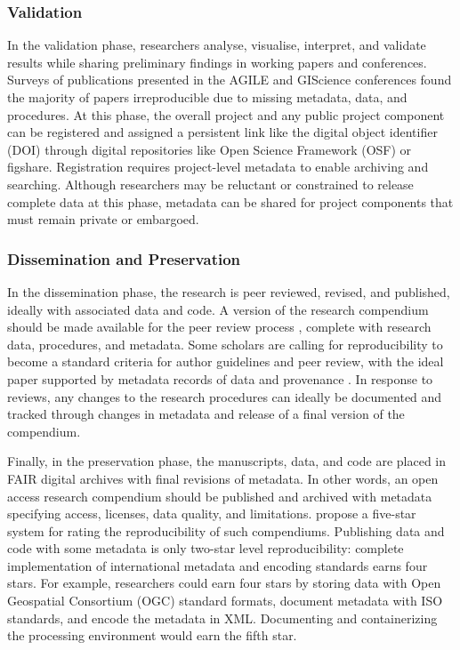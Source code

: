 \documentclass{isprs} %
\begin{document}
\subsubsection{Validation}

In the validation phase, researchers analyse, visualise, interpret, and validate results while sharing preliminary findings in working papers and conferences.
Surveys of publications presented in the AGILE \citep{Nust2018} and GIScience \citep{Ostermann2021}  conferences found the majority of papers irreproducible due to missing metadata, data, and procedures.
At this phase, the overall project and any public project component can be registered and assigned a persistent link like the digital object identifier (DOI) through digital repositories like Open Science Framework (OSF) or figshare.
Registration requires project-level metadata to enable archiving and searching.
Although researchers may be reluctant or constrained to release complete data at this phase, metadata can be shared for project components that must remain private or embargoed.

\subsubsection{Dissemination and Preservation}

In the dissemination phase, the research is peer reviewed, revised, and published, ideally with associated data and code.
A version of the research compendium should be made available for the peer review process \citep{Singleton2016}, complete with research data, procedures, and metadata.
Some scholars are calling for reproducibility to become a standard criteria for author guidelines and peer review, with the ideal paper supported by metadata records of data and provenance \citep{Gil2016,Nust2018}.
In response to reviews, any changes to the research procedures can ideally be documented and tracked through changes in metadata and release of a final version of the compendium.

Finally, in the preservation phase, the manuscripts, data, and code are placed in FAIR digital archives with final revisions of metadata.
In other words, an open access research compendium should be published and archived with metadata specifying access, licenses, data quality, and limitations. 
\citet{Wilson2021} propose a five-star system for rating the reproducibility of such compendiums.
Publishing data and code with some metadata is only two-star level reproducibility: complete implementation of international metadata and encoding standards earns four stars.
For example, researchers could earn four stars by storing data with Open Geospatial Consortium (OGC) standard formats, document metadata with ISO standards, and encode the metadata in XML.
Documenting and containerizing the processing environment would earn the fifth star.
\end{document}
